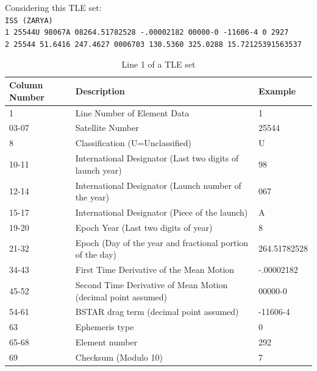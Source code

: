 \documentclass[a4paper]{article}
\begin{document}
		Considering this TLE set:\\
		\texttt{ISS (ZARYA)\\
1 25544U 98067A   08264.51782528 -.00002182  00000-0 -11606-4 0  2927\\
2 25544  51.6416 247.4627 0006703 130.5360 325.0288 15.72125391563537}
		\begin{table}[h!]
			\centering
			\caption{Line 1 of a TLE set}
			\begin{tabular}{lll}
				\textbf{Column Number} & \textbf{Description}                                                             & \textbf{Example} \\ \midrule
				1                        & Line Number of Element Data                                                      & 1                \\ \midrule
				03-07                    & Satellite Number                                                                 & 25544            \\ \midrule
				8                        & Classification (U=Unclassified)                                                  & U                \\ \midrule
				10-11                    & International Designator (Last two digits of launch year)                        & 98               \\ \midrule
				12-14                    & International Designator (Launch number of the year)                             & 067              \\ \midrule
				15-17                    & International Designator (Piece of the launch)                                   & A                \\ \midrule
				19-20                    & Epoch Year (Last two digits of year)                                             & 8                \\ \midrule
				21-32                    & Epoch (Day of the year and fractional portion of the day)                        & 264.51782528     \\ \midrule
				34-43                    & First Time Derivative of the Mean Motion                                         & -.00002182       \\ \midrule
				45-52                    & Second Time Derivative of Mean Motion (decimal point assumed)                    & 00000-0          \\ \midrule
				54-61                    & BSTAR drag term (decimal point assumed)                                          & -11606-4         \\ \midrule
				63                       & Ephemeris type                                                                   & 0                \\ \midrule
				65-68                    & Element number                                                                   & 292              \\ \midrule
				69                       & Checksum (Modulo 10) & 7 \\ \bottomrule
			\end{tabular}
		\end{table}
		
\end{document}
